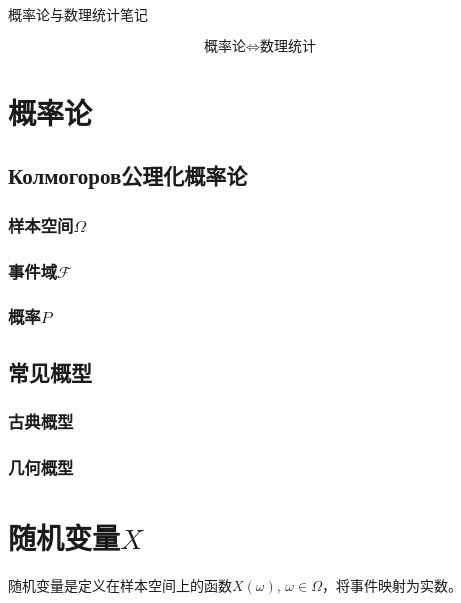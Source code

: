 \documentclass[UTF8,fontset=fandol,zihao=5]{ctexart}
\newcommand{\FF}{\mathcal{F}}
\begin{document}
\begin{center}
  {\heiti\headingfont{}\color{main} 概率论与数理统计笔记}
\end{center}

\begin{relationbox}
\[
  \boxed{\text{概率论}}
  \Longleftrightarrow
  \boxed{\text{数理统计}}
\]
\end{relationbox}

\section{概率论}

\subsection{\russiansans Колмогоров公理化概率论}

\subsubsection{样本空间$\varOmega$}

\subsubsection{事件域$\FF$}

\subsubsection{概率$P$}

\subsection{常见概型}

\subsubsection{古典概型}

\subsubsection{几何概型}

\section{随机变量$X$}

随机变量是定义在样本空间上的函数$X(\omega),\, \omega \in \varOmega$，将事件映射为实数。
\end{document}
